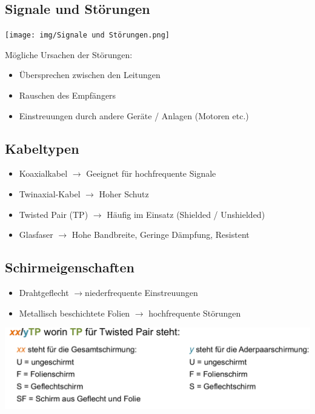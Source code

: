 \subsection{Signale und Störungen}{

    {\texttt{[image: img/Signale und Störungen.png]}}

    Mögliche Ursachen der Störungen:
    \begin{itemize}[noitemsep]
        \item Übersprechen zwischen den Leitungen
        \item Rauschen des Empfängers
        \item Einstreuungen durch andere Geräte / Anlagen (Motoren etc.)
    \end{itemize}

}

\subsection{Kabeltypen}{
    \begin{itemize}[noitemsep]
        \item Koaxialkabel $\to$ Geeignet für hochfrequente Signale
        \item Twinaxial-Kabel $\to$ Hoher Schutz
        \item Twisted Pair (TP) $\to$ Häufig im Einsatz (Shielded / Unshielded)
        \item Glasfaser $\to$ Hohe Bandbreite, Geringe Dämpfung, Resistent
    \end{itemize}
}
\subsection{Schirmeigenschaften}
{ \begin{itemize}[noitemsep]
        \item Drahtgeflecht $\to$niederfrequente Einstreuungen
        \item Metallisch beschichtete Folien $\to$ hochfrequente Störungen
    \end{itemize}}
{   {\includegraphics[scale=.225]{img/twisted.png}}}

